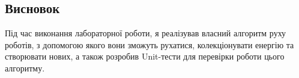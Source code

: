 \documentclass[14pt]{extreport}
\begin{document}
\begin{normalsize}
	\section*{Висновок}
	Під час виконання лабораторної роботи, я реалізував власний алгоритм руху роботів, з допомогою якого вони зможуть рухатися, колекціонувати енергію та створювати нових, а також розробив Unit-тести для перевірки роботи цього алгоритму.
	
	 
\end{normalsize}
\end{document}
